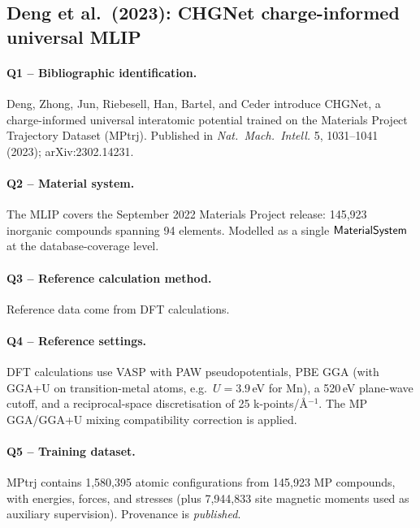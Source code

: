 \subsection{Deng et al.\ (2023): CHGNet charge-informed universal MLIP}
\label{sec:appendix-example-deng2023}

\paragraph{Q1 -- Bibliographic identification.}
Deng, Zhong, Jun, Riebesell, Han, Bartel, and Ceder introduce CHGNet,
a charge-informed universal interatomic potential trained on the
Materials Project Trajectory Dataset (MPtrj). Published in
\emph{Nat.\ Mach.\ Intell.} 5, 1031--1041 (2023); arXiv:2302.14231.


\paragraph{Q2 -- Material system.}
The MLIP covers the September 2022 Materials Project release: 145{,}923
inorganic compounds spanning 94 elements. Modelled as a single
$\mathsf{MaterialSystem}$ at the database-coverage level.


\paragraph{Q3 -- Reference calculation method.}
Reference data come from DFT calculations.


\paragraph{Q4 -- Reference settings.}
DFT calculations use VASP with PAW pseudopotentials, PBE GGA (with
GGA+U on transition-metal atoms, e.g.\ $U=3.9$\,eV for Mn), a 520\,eV
plane-wave cutoff, and a reciprocal-space discretisation of 25
k-points/\AA$^{-1}$. The MP GGA/GGA+U mixing compatibility correction
is applied.


\paragraph{Q5 -- Training dataset.}
MPtrj contains 1{,}580{,}395 atomic configurations from 145{,}923 MP
compounds, with energies, forces, and stresses (plus 7{,}944{,}833 site
magnetic moments used as auxiliary supervision). Provenance is
\emph{published}.


